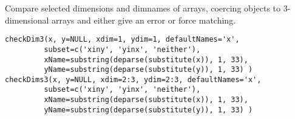 \begin{Description}\relax
Compare selected dimensions and dimnames of arrays, coercing objects
to 3-dimensional arrays and either give an error or force matching.
\end{Description}
\begin{Usage}
\begin{verbatim}
checkDim3(x, y=NULL, xdim=1, ydim=1, defaultNames='x',
         subset=c('xiny', 'yinx', 'neither'),
         xName=substring(deparse(substitute(x)), 1, 33),
         yName=substring(deparse(substitute(y)), 1, 33) )
checkDims3(x, y=NULL, xdim=2:3, ydim=2:3, defaultNames='x',
         subset=c('xiny', 'yinx', 'neither'),
         xName=substring(deparse(substitute(x)), 1, 33),
         yName=substring(deparse(substitute(y)), 1, 33) )
\end{verbatim}
\end{Usage}
